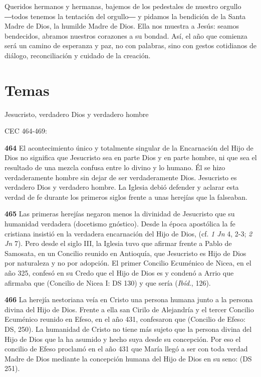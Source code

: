 Queridos hermanos y hermanas, bajemos de los pedestales de nuestro orgullo ―todos tenemos la tentación del orgullo― y pidamos la bendición de la Santa Madre de Dios, la humilde Madre de Dios. Ella nos muestra a Jesús: seamos bendecidos, abramos nuestros corazones a su bondad. Así, el año que comienza será un camino de esperanza y paz, no con palabras, sino con gestos cotidianos de diálogo, reconciliación y cuidado de la creación.


\section{Temas}

Jesucristo, verdadero Dios y verdadero hombre

CEC 464-469:

\textbf{464} El acontecimiento único y totalmente singular de la Encarnación del Hijo de Dios no significa que Jesucristo sea en parte Dios y en parte hombre, ni que sea el resultado de una mezcla confusa entre lo divino y lo humano. Él se hizo verdaderamente hombre sin dejar de ser verdaderamente Dios. Jesucristo es verdadero Dios y verdadero hombre. La Iglesia debió defender y aclarar esta verdad de fe durante los primeros siglos frente a unas herejías que la falseaban.

\textbf{465} Las primeras herejías negaron menos la divinidad de Jesucristo que su humanidad verdadera (docetismo gnóstico). Desde la época apostólica la fe cristiana insistió en la verdadera encarnación del Hijo de Dios,  (cf. \emph{1 Jn} 4, 2-3; \emph{2 Jn} 7). Pero desde el siglo III, la Iglesia tuvo que afirmar frente a Pablo de Samosata, en un Concilio reunido en Antioquía, que Jesucristo es Hijo de Dios por naturaleza y no por adopción. El primer Concilio Ecuménico de Nicea, en el año 325, confesó en su Credo que el Hijo de Dios es  y condenó a Arrio que afirmaba que  (Concilio de Nicea I: DS 130) y que sería  (\emph{Ibíd}., 126).

\textbf{466} La herejía nestoriana veía en Cristo una persona humana junto a la persona divina del Hijo de Dios. Frente a ella san Cirilo de Alejandría y el tercer Concilio Ecuménico reunido en Efeso, en el año 431, confesaron que  (Concilio de Efeso: DS, 250). La humanidad de Cristo no tiene más sujeto que la persona divina del Hijo de Dios que la ha asumido y hecho suya desde su concepción. Por eso el concilio de Efeso proclamó en el año 431 que María llegó a ser con toda verdad Madre de Dios mediante la concepción humana del Hijo de Dios en su seno:  (DS 251).

